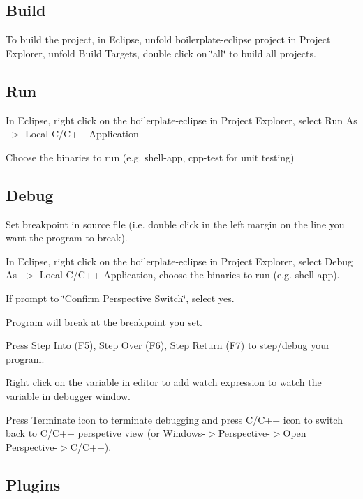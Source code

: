 \subsection*{Build}

To build the project, in Eclipse, unfold boilerplate-\/eclipse project in Project Explorer, unfold Build Targets, double click on \char`\"{}all\char`\"{} to build all projects.

\subsection*{Run}


\begin{DoxyEnumerate}
\item In Eclipse, right click on the boilerplate-\/eclipse in Project Explorer, select Run As -\/$>$ Local C/\+C++ Application
\item Choose the binaries to run (e.\+g. shell-\/app, cpp-\/test for unit testing)
\end{DoxyEnumerate}

\subsection*{Debug}


\begin{DoxyEnumerate}
\item Set breakpoint in source file (i.\+e. double click in the left margin on the line you want the program to break).
\item In Eclipse, right click on the boilerplate-\/eclipse in Project Explorer, select Debug As -\/$>$ Local C/\+C++ Application, choose the binaries to run (e.\+g. shell-\/app).
\item If prompt to \char`\"{}\+Confirm Perspective Switch\char`\"{}, select yes.
\item Program will break at the breakpoint you set.
\item Press Step Into (F5), Step Over (F6), Step Return (F7) to step/debug your program.
\item Right click on the variable in editor to add watch expression to watch the variable in debugger window.
\item Press Terminate icon to terminate debugging and press C/\+C++ icon to switch back to C/\+C++ perspetive view (or Windows-\/$>$Perspective-\/$>$Open Perspective-\/$>$C/\+C++).
\end{DoxyEnumerate}

\subsection*{Plugins}


